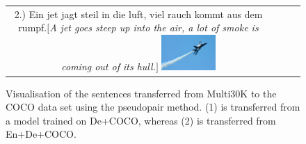 \begin{figure}[t]
\begin{center}
\begin{tabular}{cccc}
{2.) Ein jet jagt steil in die luft, viel rauch kommt aus dem rumpf.\newline$\lbrack$\emph{A jet goes steep up into the air, a lot of smoke is coming out of its hull.}$\rbrack$}
{\includegraphics[width = 0.21\textwidth]{chapters/EMNLP2/assets/5.png}}
\end{tabular}
\end{center}

\caption{Visualisation of the sentences transferred from Multi30K to the COCO data set using the pseudopair method. (1) is transferred from a model trained on De+COCO, whereas (2) is transferred from En+De+COCO.}
\label{fig:pseudopairs}
\end{figure}

